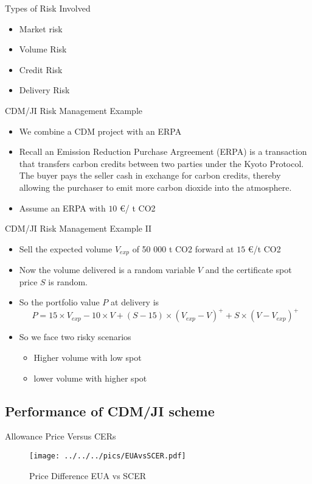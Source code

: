 {Types of Risk Involved}
\begin{itemize}
\item<1-> Market risk
\item<2-> Volume Risk
\item<3-> Credit Risk
\item<4-> Delivery Risk
\end{itemize}

{CDM/JI Risk Management Example}
\begin{itemize}
\item<1-> We combine a CDM project with an ERPA
\item<2-> Recall an Emission Reduction Purchase Argreement (ERPA) is a  transaction that transfers carbon credits between two parties under the Kyoto Protocol. The buyer pays the seller cash in exchange for carbon credits, thereby allowing the purchaser to emit more carbon dioxide into the atmosphere.
\item<3-> Assume an ERPA with $10$ \euro/ t CO2
\end{itemize}

{CDM/JI Risk Management Example II}
\begin{itemize}
\item<1-> Sell the expected volume $V_{exp}$ of 50 000 t CO2 forward at $15$ \euro /t CO2
\item<2-> Now the volume delivered is a random variable $V$ and the certificate spot price $S$ is random.
\item<3-> So the portfolio value $P$ at delivery is
\begin{equation}\nonumber
P = 15 \times V_{exp} - 10 \times V + (S-15) \times (V_{exp}-V)^+ + S \times (V-V_{exp})^+
\end{equation}
\item<4-> So we face two risky scenarios
\begin{itemize}
\item Higher volume with low spot
\item lower volume with higher spot
\end{itemize}
\end{itemize}

\subsection{Performance of CDM/JI scheme}

{Allowance Price Versus CERs}
\begin{figure}[h!]
\centering
\texttt{[image: ../../../pics/EUAvsSCER.pdf]}
\caption{Price Difference EUA vs SCER}
\label{fig:EUAvsSCER}
\end{figure}

